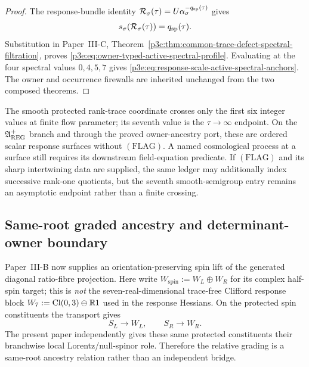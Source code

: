 \documentclass[12pt,a4paper]{article}
\begin{document}
\begin{proof}
The response-bundle identity
\(\mathcal R_\sigma(\tau)=U\alpha_\sigma^{-q_{\rm sp}(\tau)}\) gives
\[
 s_\sigma(\mathcal R_\sigma(\tau))=q_{\rm sp}(\tau).
\]
Substitution in Paper~III-C,
Theorem~\ref{p3c:thm:common-trace-defect-spectral-filtration}, proves
\eqref{p3e:eq:owner-typed-active-spectral-profile}.  Evaluating at the four
spectral values \(0,4,5,7\) gives
\eqref{p3e:eq:response-scale-active-spectral-anchors}.  The owner and
occurrence firewalls are inherited unchanged from the two composed theorems.
\end{proof}

\begin{remark}
The smooth protected rank-trace coordinate crosses only the first six integer
values at finite flow parameter; its seventh value is the
\(\tau\to\infty\) endpoint.  On the
\(\mathfrak A_{\rm REG}^{+}\) branch and through the proved owner-ancestry
port, these are ordered scalar response surfaces without
\((\mathrm{FLAG})\).  A named
cosmological process at a surface still requires its downstream field-equation
predicate.  If \((\mathrm{FLAG})\) and its sharp intertwining data are
supplied, the same ledger may additionally index successive rank-one
quotients, but the seventh smooth-semigroup entry remains an asymptotic
endpoint rather than a finite crossing.
\end{remark}

\label{p3:part:dyn-grav}
\label{p3:part:gravity-master-action}

\subsection{Same-root graded ancestry and determinant-owner boundary}
\label{p3e:sec:graded-owner-update}

Paper~III-B now supplies an orientation-preserving spin lift of the generated
diagonal ratio-fibre projection.  Here write
$W_{\mathrm{spin}}:=W_L\oplus W_R$ for its complex half-spin target;
this is \emph{not} the seven-real-dimensional trace-free Clifford response
block $W_7:=\operatorname{Cl}(0,3)\ominus\mathbb R1$ used in the response Hessians.
On the protected spin constituents the transport gives
\[
 S_L\longrightarrow W_L,
 \qquad
 S_R\longrightarrow W_R.
\]
The present paper independently gives these same protected constituents their
branchwise local Lorentz/null-spinor role.  Therefore the relative grading is
a same-root ancestry relation rather than an independent bridge.
\end{document}
